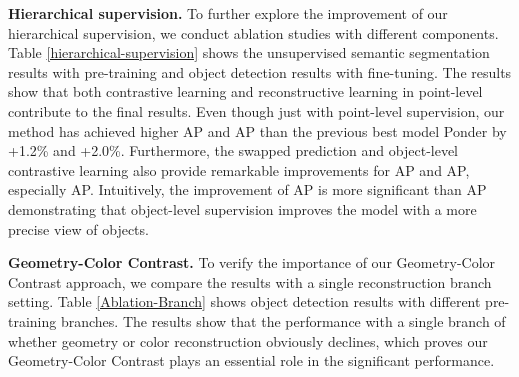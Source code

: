 \documentclass{article}
\begin{document}
\textbf{Hierarchical supervision.} To further explore the improvement of our hierarchical supervision, we conduct ablation studies with different components. Table \ref{hierarchical-supervision} shows the unsupervised semantic segmentation results with pre-training and object detection results with fine-tuning. The results show that both contrastive learning and reconstructive learning in point-level contribute to the final results. Even though just with point-level supervision, our method has achieved higher AP and AP than the previous best model Ponder by +1.2\% and +2.0\%. Furthermore, the swapped prediction and object-level contrastive learning also provide remarkable improvements for AP and AP, especially AP. 
Intuitively, the improvement of AP is more significant than AP demonstrating that object-level supervision improves the model with a more precise view of objects.

\textbf{Geometry-Color Contrast.} To verify the importance of our Geometry-Color Contrast approach, we compare the results with a single reconstruction branch setting. Table \ref{Ablation-Branch} shows object detection results with different pre-training branches. The results show that the performance with a single branch of whether geometry or color reconstruction obviously declines, which proves our Geometry-Color Contrast plays an essential role in the significant performance.
\end{document}

